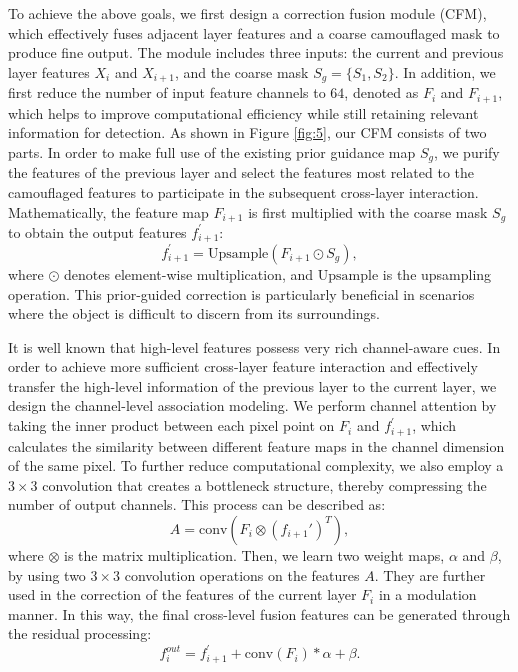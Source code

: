 \documentclass[sigconf,screen]{acmart}
\begin{document}
To achieve the above goals, we first design a correction fusion module (CFM), which effectively fuses adjacent layer features and a coarse camouflaged mask to produce fine output. The module includes three inputs: the current and previous layer features \(X_{i}\) and \(X_{i+1}\), and the coarse mask $S_g=\{S_1,S_2\}$. In addition, we first reduce the number of input feature channels to $64$, denoted as $F_i$ and $F_{i+1}$, which helps to improve computational efficiency while still retaining relevant information for detection.  
As shown in Figure \ref{fig:5}, our CFM consists of two parts.
In order to make full use of the existing prior guidance map \(S_g\), we purify the features of the previous layer and select the features most related to the camouflaged features to participate in the subsequent cross-layer interaction.
Mathematically, the feature map \(F_{i+1}\) is first multiplied with the coarse mask \(S_g\) to obtain the output features \(f^{'}_{i+1}\): 
\begin{equation}
    f^{'}_{i+1} = \mathrm{Upsample}(F_{i+1} \odot S_g),
    \label{eq4}
\end{equation}
where $\odot$ denotes element-wise multiplication, and $\mathrm{Upsample}$ is the upsampling operation. 
This prior-guided correction is particularly beneficial in scenarios where the object is difficult to discern from its surroundings.


It is well known that high-level features possess very rich channel-aware cues. In order to achieve more sufficient cross-layer feature interaction and effectively transfer the high-level information of the previous layer to the current layer, we design the channel-level association modeling.
We perform channel attention by taking the inner product between each pixel point on \(F_i\) and \(f^{'} _{i+1}\), which calculates the similarity between different feature maps in the channel dimension of the same pixel. 
To further reduce computational complexity, we also employ a \(3\times 3\) convolution that creates a bottleneck structure, thereby compressing the number of output channels. This process can be described as:  
\begin{equation}
A = \mathrm{conv}(F_i \otimes (f_{i+1}')^T),
    \label{eq6}
\end{equation}
where $\otimes$ is the matrix multiplication.
Then, we learn two weight maps, \(\alpha\) and \(\beta\), by using two \(3\times 3\) convolution operations on the features \(A\). 
They are further used in the correction of the features of the current layer \(F_i\) in a modulation manner. 
In this way, the final cross-level fusion features can be generated through the residual processing:    
\begin{equation}
    f^{out}_i = f_{i+1}^{'} + \mathrm{conv} (F_i) *\alpha +\beta.
\end{equation}
\end{document}
